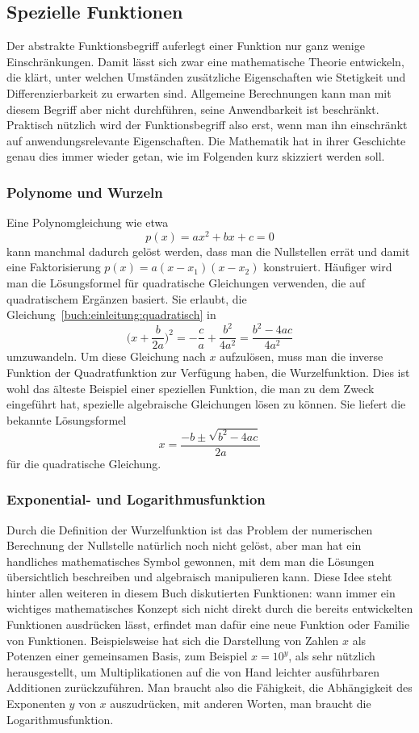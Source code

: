 %
%
\subsection*{Spezielle Funktionen}
Der abstrakte Funktionsbegriff auferlegt einer Funktion nur ganz wenige
Einschränkungen.
Damit lässt sich zwar eine mathematische Theorie entwickeln, die 
klärt, unter welchen Umständen zusätzliche Eigenschaften wie Stetigkeit
und Differenzierbarkeit zu erwarten sind.
Allgemeine Berechnungen kann man mit diesem Begriff aber nicht durchführen,
seine Anwendbarkeit ist beschränkt.
Praktisch nützlich wird der Funktionsbegriff also erst, wenn man ihn
einschränkt auf anwendungsrelevante Eigenschaften.
Die Mathematik hat in ihrer Geschichte genau dies immer wieder
getan, wie im Folgenden kurz skizziert werden soll.

%
%
\subsubsection{Polynome und Wurzeln}
Eine Polynomgleichung wie etwa
\begin{equation}
p(x) = ax^2+bx+c = 0
\label{buch:einleitung:quadratisch}
\end{equation}
kann manchmal dadurch gelöst werden, dass man die Nullstellen errät
und damit eine Faktorisierung $p(x)=a(x-x_1)(x-x_2)$ konstruiert.
Häufiger wird man die Lösungsformel für quadratische 
Gleichungen verwenden, die auf quadratischem Ergänzen basiert.
Sie erlaubt, die Gleichung~\eqref{buch:einleitung:quadratisch} in
\[
\biggl(x + \frac{b}{2a}\biggr)^2
=
-\frac{c}{a} + \frac{b^2}{4a^2}
=
\frac{b^2-4ac}{4a^2}
\]
umzuwandeln.
Um diese Gleichung nach $x$ aufzulösen, muss man die inverse Funktion
der Quadratfunktion zur Verfügung haben, die Wurzelfunktion.
Dies ist wohl das älteste Beispiel einer speziellen Funktion,
die man zu dem Zweck eingeführt hat, spezielle algebraische Gleichungen
lösen zu können.
Sie liefert die bekannte Lösungsformel
\[
x=\frac{-b\pm\sqrt{b^2-4ac}}{2a}
\]
für die quadratische Gleichung.

%
%
\subsubsection{Exponential- und Logarithmusfunktion}
Durch die Definition der Wurzelfunktion ist das Problem der numerischen
Berechnung der Nullstelle natürlich noch nicht gelöst, aber man hat
ein handliches mathematisches Symbol gewonnen, mit dem man die Lösungen
übersichtlich beschreiben und algebraisch manipulieren kann.
Diese Idee steht hinter allen weiteren in diesem Buch diskutierten
Funktionen: wann immer ein wichtiges mathematisches Konzept sich nicht
direkt durch die bereits entwickelten Funktionen ausdrücken lässt,
erfindet man dafür eine neue Funktion oder Familie von Funktionen.
Beispielsweise hat sich die Darstellung von Zahlen $x$ als Potenzen
einer gemeinsamen Basis, zum Beispiel $x=10^y$, als sehr nützlich
herausgestellt, um Multiplikationen auf die von Hand leichter
ausführbaren Additionen zurückzuführen.
Man braucht also die Fähigkeit, die Abhängigkeit des Exponenten $y$
von $x$ auszudrücken, mit anderen Worten, man braucht die
Logarithmusfunktion.

